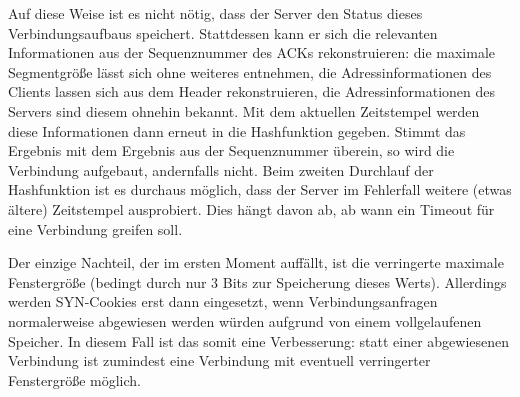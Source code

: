 Auf diese Weise ist es nicht nötig, dass der Server den Status dieses Verbindungsaufbaus speichert. Stattdessen kann er sich die relevanten Informationen aus der Sequenznummer des ACKs rekonstruieren: die maximale Segmentgröße lässt sich ohne weiteres entnehmen, die Adressinformationen des Clients lassen sich aus dem Header rekonstruieren, die Adressinformationen des Servers sind diesem ohnehin bekannt. Mit dem aktuellen Zeitstempel werden diese Informationen dann erneut in die Hashfunktion gegeben. Stimmt das Ergebnis mit dem Ergebnis aus der Sequenznummer überein, so wird die Verbindung aufgebaut, andernfalls nicht. Beim zweiten Durchlauf der Hashfunktion ist es durchaus möglich, dass der Server im Fehlerfall weitere (etwas ältere) Zeitstempel ausprobiert. Dies hängt davon ab, ab wann ein Timeout für eine Verbindung greifen soll.

Der einzige Nachteil, der im ersten Moment auffällt, ist die verringerte maximale Fenstergröße (bedingt durch nur 3 Bits zur Speicherung dieses Werts). Allerdings werden SYN-Cookies erst dann eingesetzt, wenn Verbindungsanfragen normalerweise abgewiesen werden würden aufgrund von einem vollgelaufenen Speicher. In diesem Fall ist das somit eine Verbesserung: statt einer abgewiesenen Verbindung ist zumindest eine Verbindung mit eventuell verringerter Fenstergröße möglich. \cite{BernsteinSYN}
